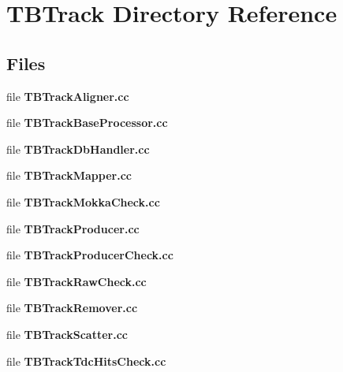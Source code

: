 \section{T\-B\-Track Directory Reference}
\label{dir_dce88a58c3a88d7ac3f0c5a456556ad0}
\subsection*{Files}
\begin{DoxyCompactItemize}
\item 
file {\bfseries T\-B\-Track\-Aligner.\-cc}
\item 
file {\bfseries T\-B\-Track\-Base\-Processor.\-cc}
\item 
file {\bfseries T\-B\-Track\-Db\-Handler.\-cc}
\item 
file {\bfseries T\-B\-Track\-Mapper.\-cc}
\item 
file {\bfseries T\-B\-Track\-Mokka\-Check.\-cc}
\item 
file {\bfseries T\-B\-Track\-Producer.\-cc}
\item 
file {\bfseries T\-B\-Track\-Producer\-Check.\-cc}
\item 
file {\bfseries T\-B\-Track\-Raw\-Check.\-cc}
\item 
file {\bfseries T\-B\-Track\-Remover.\-cc}
\item 
file {\bfseries T\-B\-Track\-Scatter.\-cc}
\item 
file {\bfseries T\-B\-Track\-Tdc\-Hits\-Check.\-cc}
\end{DoxyCompactItemize}
